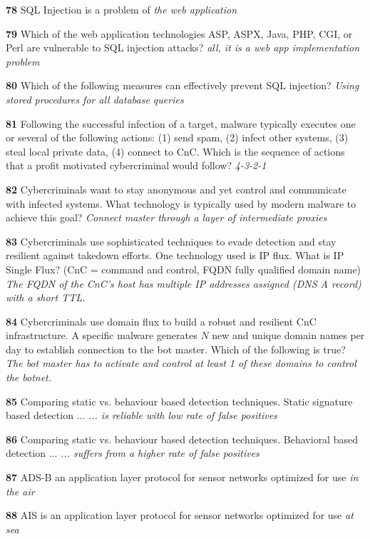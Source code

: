 \textbf{  78}  SQL Injection is a problem of  
\textit{ the web application}

\textbf{  79}  Which of the web application technologies ASP, ASPX, Java, PHP, CGI, or Perl are vulnerable to SQL injection attacks? 
\textit{ all, it is a web app implementation problem}

\textbf{  80}  Which of the following measures can effectively prevent SQL injection?  
\textit{ Using stored procedures for all database queries}

\textbf{  81}  Following the successful infection of a target, malware typically executes one or several of the following actions: (1) send spam, (2) infect other systems, (3) steal local private data, (4) connect to CnC. Which is the sequence of actions that a profit motivated cybercriminal would follow?  
\textit{ 4-3-2-1}

\textbf{  82}  Cybercriminals want to stay anonymous and yet control and communicate with infected systems. What technology is typically used by modern malware to achieve this goal? 
\textit{ Connect master through a layer of intermediate proxies}

\textbf{  83}  Cybercriminals use sophisticated techniques to evade detection and stay resilient against takedown efforts. One technology used is IP flux. What is IP Single Flux? (CnC = command and control, FQDN fully qualified domain name) 
\textit{ The FQDN of the CnC’s host has multiple IP addresses assigned (DNS A record) with a short TTL.}

\textbf{  84}  Cybercriminals use domain flux to build a robust and resilient CnC infrastructure. A specific malware generates $N$ new and unique domain names per day to establish connection to the bot master. Which of the following is true? 
\textit{ The bot master has to activate and control at least 1 of these domains to control the botnet.}

\textbf{  85}  Comparing static vs. behaviour based detection techniques. Static signature based detection ... 
\textit{ ... is reliable with low rate of false positives}

\textbf{  86}  Comparing static vs. behaviour based detection techniques. Behavioral based detection ... 
\textit{ ... suffers from a higher rate of false positives}

\textbf{  87}  ADS-B an application layer protocol for sensor networks optimized for use  
\textit{ in the air}

\textbf{  88}  AIS is an application layer protocol for sensor networks optimized for use  
\textit{ at sea}

